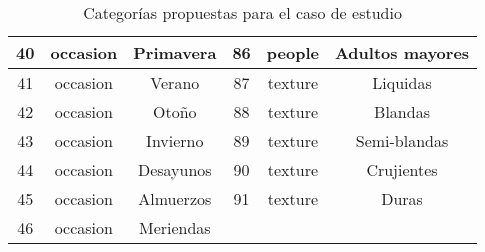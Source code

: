 \begin{table}
\begin{center}
\begin{tabular}{ | c | c | c | c | c | c |}
        \midrule
        40 & occasion  & Primavera & 86 & people  & Adultos mayores \\
        \midrule
        41 & occasion  & Verano & 87 & texture  & Liquidas \\
        \midrule
        42 & occasion  & Otoño & 88 & texture  & Blandas \\
        \midrule
        43 & occasion  & Invierno & 89 & texture  & Semi-blandas \\
        \midrule
        44 & occasion  & Desayunos & 90 & texture  & Crujientes \\
        \midrule
        45 & occasion  & Almuerzos & 91 & texture  & Duras \\
        \midrule
        46 & occasion  & Meriendas & & & \\
        \bottomrule
      \end{tabular}
      \caption{Categorías propuestas para el caso de estudio}
      \label{Categorías propuestas para el caso de estudio}
    \end{center}
  \end{table}

